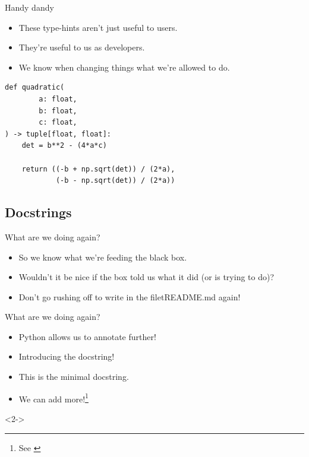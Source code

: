 \documentclass[usenames,dvipsnames]{beamer}
\newcommand{\filet}[1]{\textcolor{blue}{\texttt{\detokenize{#1}}}}
\begin{document}
\begin{frame}[fragile]{Handy dandy}
    \begin{itemize}[<+->]
        \item{}These type-hints aren't just useful to users.
        \item{}They're useful to us as developers.
        \item{}We know when changing things what we're allowed to do.
    \end{itemize}

    \begin{lstlisting}[basicstyle=\scriptsize]
def quadratic(
        a: float, 
        b: float, 
        c: float,
) -> tuple[float, float]:
    det = b**2 - (4*a*c)

    return ((-b + np.sqrt(det)) / (2*a),
            (-b - np.sqrt(det)) / (2*a))
    \end{lstlisting}

\end{frame}

\subsection{Docstrings}

\begin{frame}{What are we doing again?}
    \begin{itemize}[<+->]
        \item{}So we know what we're feeding the black box.
        \item{}Wouldn't it be nice if the box told us what it did (or is trying to do)?
        \item{}Don't go rushing off to write in the filet{README.md} again!
    \end{itemize}
\end{frame}

\begin{frame}{What are we doing again?}
    \begin{itemize}[<+->]
        \item{}Python allows us to annotate further!
        \item{}Introducing the docstring!
        \item{}This is the minimal docstring.
        \item{}We can add more!\footnote{See \filet{quadexm.py}}
    \end{itemize}

    \begin{onlyenv}<2->
        
    \end{onlyenv}
\end{frame}
\end{document}
